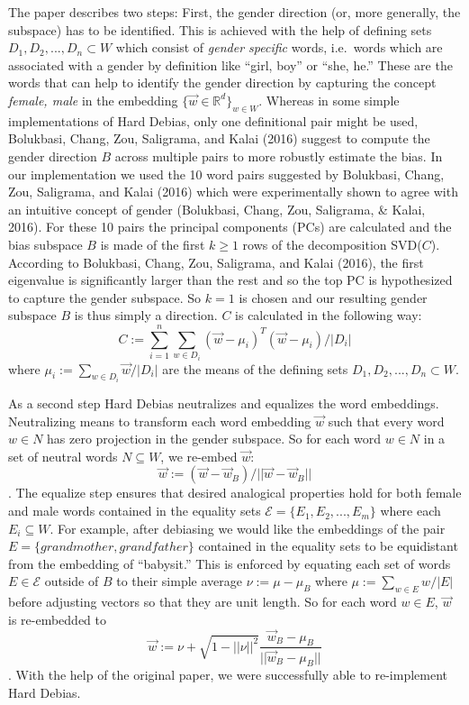 \documentclass[
  english,
  man,floatsintext]{apa6}
\begin{document}
The paper describes two steps: First, the gender direction (or, more generally, the subspace) has to be identified. This is achieved with the help of defining sets \(D_1, D_2, ..., D_n \subset W\) which consist of \emph{gender specific} words, i.e.~words which are associated with a gender by definition like ``girl, boy'' or ``she, he.'' These are the words that can help to identify the gender direction by capturing the concept \emph{female, male} in the embedding \(\{\vec{w}\in\mathbb{R}^d\}_{w\in W}\). Whereas in some simple implementations of Hard Debias, only one definitional pair might be used, Bolukbasi, Chang, Zou, Saligrama, and Kalai (2016) suggest to compute the gender direction \(B\) across multiple pairs to more robustly estimate the bias. In our implementation we used the 10 word pairs suggested by Bolukbasi, Chang, Zou, Saligrama, and Kalai (2016) which were experimentally shown to agree with an intuitive concept of gender (Bolukbasi, Chang, Zou, Saligrama, \& Kalai, 2016). For these 10 pairs the principal components (PCs) are calculated and the bias subspace \(B\) is made of the first \(k \geq 1\) rows of the decomposition SVD(\(C\)). According to Bolukbasi, Chang, Zou, Saligrama, and Kalai (2016), the first eigenvalue is significantly larger than the rest and so the top PC is hypothesized to capture the gender subspace. So \(k=1\) is chosen and our resulting gender subspace \(B\) is thus simply a direction. \(C\) is calculated in the following way: \[C:=\sum_{i=1}^n \sum_{w\in D_i}(\vec{w}-\mu_i)^T(\vec{w}-\mu_i)/|D_i|\] where \(\mu_i := \sum_{w\in D_i}\vec{w}/|D_i|\) are the means of the defining sets \(D_1, D_2, ..., D_n \subset W\).

As a second step Hard Debias neutralizes and equalizes the word embeddings. Neutralizing means to transform each word embedding \(\vec{w}\) such that every word \(w\in N\) has zero projection in the gender subspace. So for each word \(w\in N\) in a set of neutral words \(N \subseteq W\), we re-embed \(\vec{w}\): \[\vec{w}:=(\vec{w}-\vec{w}_B)/||\vec{w}-\vec{w}_B||\]. The equalize step ensures that desired analogical properties hold for both female and male words contained in the equality sets \(\mathcal{E}=\{E_1,E_2,...,E_m\}\) where each \(E_i \subseteq W\). For example, after debiasing we would like the embeddings of the pair \(E=\{grandmother, grandfather\}\) contained in the equality sets to be equidistant from the embedding of ``babysit.'' This is enforced by equating each set of words \(E\in \mathcal{E}\) outside of \(B\) to their simple average \(\nu:=\mu-\mu_B\) where \(\mu:=\sum_{w\in E}w/|E|\) before adjusting vectors so that they are unit length. So for each word \(w\in E\), \(\vec{w}\) is re-embedded to \[\vec{w}:=\nu+\sqrt{1-||\nu||^2}\frac{\vec{w}_B-\mu_B}{||\vec{w}_B-\mu_B||}\].
With the help of the original paper, we were successfully able to re-implement Hard Debias.
\end{document}
